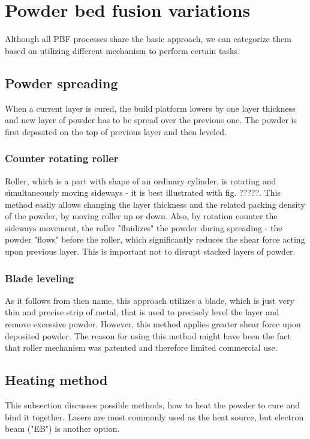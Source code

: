 \documentclass[a4paper, twoside, 11pt]{report}
\begin{document}
\section{Powder bed fusion variations}
Although all PBF processes share the basic approach, we can categorize them based on utilizing different mechanism to perform certain tasks.

\subsection{Powder spreading}
When a current layer is cured, the build platform lowers by one layer thickness and new layer of powder has to be spread over the previous one. The powder is first deposited on the top of previous layer and then leveled.
\subsubsection{Counter rotating roller}
Roller, which is a part with shape of an ordinary cylinder, is rotating and simultaneously moving sideways - it is best illustrated with fig. ?????. This method easily allows changing the layer thickness and the related packing density of the powder, by moving roller up or down. Also, by rotation counter the sideways movement, the roller "fluidizes" the powder during spreading - the powder "flows" before the roller, which significantly reduces the shear force acting upon previous layer. This is important not to disrupt stacked layers of powder.
\subsubsection{Blade leveling}
As it follows from then name, this approach utilizes a blade, which is just very thin and precise strip of metal, that is used to precisely level the layer and remove excessive powder. However, this method applies greater shear force upon deposited powder. The reason for using this method might have been the fact that roller mechanism was patented and therefore limited commercial use.

\subsection{Heating method}
This subsection discusses possible methods, how to heat the powder to cure and bind it together. Lasers are most commonly used as the heat source, but electron beam ("EB") is another option.
\end{document}
